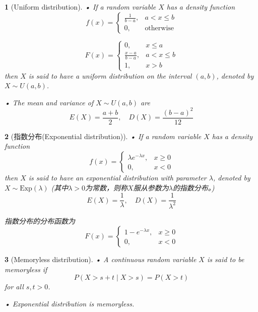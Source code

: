 \documentclass[UTF8]{report}
\theoremstyle{MyLineTheoremStyle} %
\theoremstyle{MyBlockTheoremStyle} %
\theoremstyle{MySubsubsectionStyle} %
\newtheorem{definition}{}
\begin{document}
\begin{definition}[Uniform distribution]
    • If a random variable \(X\) has a density function
    \[
    f(x) = 
    \begin{cases}
        \frac{1}{b - a}, & a < x \leq b \\
        0, & \text{otherwise}
    \end{cases}
    \]\par
    \[F(x) = 
    \begin{cases}
        0, & x \leq a \\
        \frac{x - a}{b - a}, & a < x \leq b \\
        1, & x > b
    \end{cases}
    \]
    then \(X\) is said to have a uniform distribution on the interval \((a, b)\), denoted by \(X \sim U(a, b)\).\par
    • The mean and variance of \(X \sim U(a, b)\) are
    \[
    E(X) = \frac{a + b}{2}, \quad D(X) = \frac{(b - a)^2}{12}
    \]
\end{definition}

\begin{definition}[指数分布(Exponential distribution)]
    • If a random variable \(X\) has a density function
    \[
    f(x) = 
    \begin{cases}
        \lambda e^{-\lambda x}, & x \geq 0 \\
        0, & x < 0
    \end{cases}
    \]
    then \(X\) is said to have an exponential distribution with parameter \(\lambda\), denoted by \(X \sim \text{Exp}(\lambda)\)
    (其中$\lambda > 0$为常数，则称$X$服从参数为$\lambda$的指数分布。)
    \[E(X) = \frac{1}{\lambda}, \quad D(X) = \frac{1}{\lambda^2}
    \]\par
    指数分布的分布函数为
    \[
    F(x) =
    \begin{cases}
        1 - e^{-\lambda x}, & x \geq 0 \\
        0, & x < 0
    \end{cases}
    \]
\end{definition}

\begin{definition}[Memoryless distribution]
    • A continuous random variable \(X\) is said to be memoryless if
    \[
    P(X > s + t \mid X > s) = P(X > t)
    \]
    for all \(s, t > 0\).\par
    • Exponential distribution is memoryless.
\end{definition}
\end{document}
